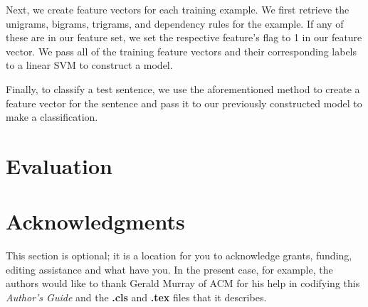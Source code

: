 \documentclass{acm_proc_article-sp}
\begin{document}
Next, we create feature vectors for each training example. We first retrieve the unigrams, bigrams, trigrams, and dependency rules for the example. If any of these are in our feature set, we set the respective feature's flag to 1 in our feature vector. We pass all of the training feature vectors and their corresponding labels to a linear SVM to construct a model.

Finally, to classify a test sentence, we use the aforementioned method to create a feature vector for the sentence and pass it to our previously constructed model to make a classification. 

\section{Evaluation}

\section{Acknowledgments}
This section is optional; it is a location for you
to acknowledge grants, funding, editing assistance and
what have you.  In the present case, for example, the
authors would like to thank Gerald Murray of ACM for
his help in codifying this \textit{Author's Guide}
and the \textbf{.cls} and \textbf{.tex} files that it describes.

%

%
%

\end{document}
